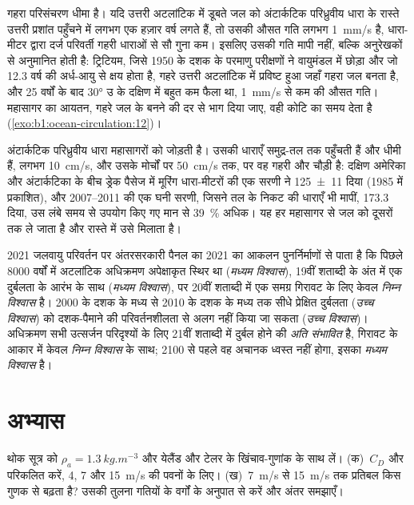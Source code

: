 गहरा परिसंचरण धीमा है। यदि उत्तरी अटलांटिक में डूबते जल को अंटार्कटिक परिध्रुवीय धारा के रास्ते उत्तरी प्रशांत पहुँचने में लगभग एक हज़ार वर्ष लगते हैं, तो उसकी औसत गति लगभग \qty{1}{mm/s} है, धारा-मीटर द्वारा दर्ज परिवर्ती गहरी धाराओं से सौ गुना कम। इसलिए उसकी गति मापी नहीं, बल्कि अनुरेखकों से अनुमानित होती है: ट्रिटियम, जिसे 1950 के दशक के परमाणु परीक्षणों ने वायुमंडल में छोड़ा और जो 12.3 वर्ष की अर्ध-आयु से क्षय होता है, गहरे उत्तरी अटलांटिक में प्रविष्ट हुआ जहाँ गहरा जल बनता है, और 25 वर्षों के बाद \ang{30} उ के दक्षिण में बहुत कम फैला था, \qty{1}{mm/s} से कम की औसत गति। महासागर का आयतन, गहरे जल के बनने की दर से भाग दिया जाए, वही कोटि का समय देता है (\cref{exo:b1:ocean-circulation:12})।

अंटार्कटिक परिध्रुवीय धारा महासागरों को जोड़ती है। उसकी धाराएँ समुद्र-तल तक पहुँचती हैं और धीमी हैं, लगभग \qty{10}{cm/s}, और उसके मोर्चों पर \qty{50}{cm/s} तक, पर वह गहरी और चौड़ी है: दक्षिण अमेरिका और अंटार्कटिका के बीच ड्रेक पैसेज में मूरिंग धारा-मीटरों की एक सरणी ने \qty[uncertainty-mode=separate]{125 \pm 11}{\sverdrup} दिया (1985 में प्रकाशित), और 2007--2011 की एक घनी सरणी, जिसने तल के निकट की धाराएँ भी मापीं, \qty{173.3}{\sverdrup} दिया, उस लंबे समय से उपयोग किए गए मान से \qty{39}{\percent} अधिक। यह हर महासागर से जल को दूसरों तक ले जाता है और रास्ते में उसे मिलाता है।

\begin{dated}{2021}
जलवायु परिवर्तन पर अंतरसरकारी पैनल का 2021 का आकलन पुनर्निर्माणों से पाता है कि पिछले \num{8000} वर्षों में अटलांटिक अधिक्रमण अपेक्षाकृत स्थिर था (\emph{मध्यम विश्वास}), 19वीं शताब्दी के अंत में एक दुर्बलता के आरंभ के साथ (\emph{मध्यम विश्वास}), पर 20वीं शताब्दी में एक समग्र गिरावट के लिए केवल \emph{निम्न विश्वास} है। 2000 के दशक के मध्य से 2010 के दशक के मध्य तक सीधे प्रेक्षित दुर्बलता (\emph{उच्च विश्वास}) को दशक-पैमाने की परिवर्तनशीलता से अलग नहीं किया जा सकता (\emph{उच्च विश्वास})। अधिक्रमण सभी उत्सर्जन परिदृश्यों के लिए 21वीं शताब्दी में दुर्बल होने की \emph{अति संभावित} है, गिरावट के आकार में केवल \emph{निम्न विश्वास} के साथ; 2100 से पहले वह अचानक ध्वस्त नहीं होगा, इसका \emph{मध्यम विश्वास} है।
\end{dated}

\section{अभ्यास}

\begin{exercise}[$\star$]\label{exo:b1:ocean-circulation:1}
थोक सूत्र को $\rho_a = \qty{1.3}{kg.m^{-3}}$ और येलैंड और टेलर के खिंचाव-गुणांक के साथ लें।
(क)~$C_D$ और  परिकलित करें, 4, 7 और \qty{15}{m/s} की पवनों के लिए। (ख)~\qty{7}{m/s} से \qty{15}{m/s} तक प्रतिबल किस गुणक से बढ़ता है? उसकी तुलना गतियों के वर्गों के अनुपात से करें और अंतर समझाएँ।
\end{exercise}

